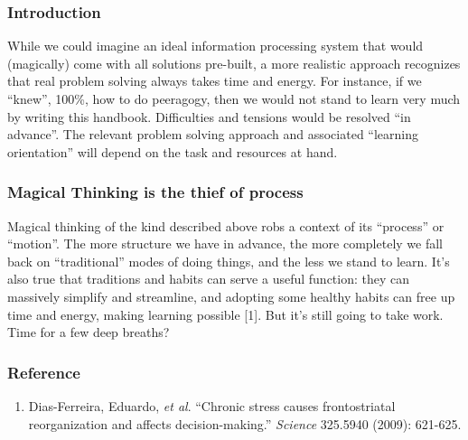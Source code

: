 \subsubsection{Introduction}

While we could imagine an ideal information processing system that would
(magically) come with all solutions pre-built, a more realistic approach
recognizes that real problem solving always takes time and energy. For
instance, if we ``knew'', 100\%, how to do peeragogy, then we would not
stand to learn very much by writing this handbook. Difficulties and
tensions would be resolved ``in advance''. The relevant problem solving
approach and associated ``learning orientation'' will depend on the task
and resources at hand.

\subsubsection{Magical Thinking is the thief of process}

Magical thinking of the kind described above robs a context of its
``process'' or ``motion''. The more structure we have in advance, the
more completely we fall back on ``traditional'' modes of doing things,
and the less we stand to learn. It's also true that traditions and
habits can serve a useful function: they can massively simplify and
streamline, and adopting some healthy habits can free up time and
energy, making learning possible {[}1{]}. But it's still going to take
work. Time for a few deep breaths?

\subsubsection{Reference}

\begin{enumerate}
\item
  Dias-Ferreira, Eduardo, \emph{et al}. ``Chronic stress causes
  frontostriatal reorganization and affects decision-making.''
  \emph{Science} 325.5940 (2009): 621-625.
\end{enumerate}
